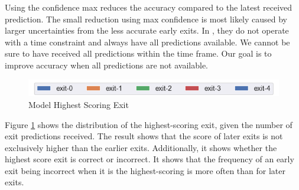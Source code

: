 Using the confidence max reduces the accuracy compared to the latest received prediction. The small reduction using max confidence is most likely caused by larger uncertainties from the less accurate early exits. In \cite{kaya_shallow-deep_nodate}, they do not operate with a time constraint and always have all predictions available. We cannot be sure to have received all predictions within the time frame. Our goal is to improve accuracy when all predictions are not available. 
\begin{figure}
	\captionsetup[subfigure]{justification=centering}
	\centering
	\includegraphics[width=.7\linewidth]{figures/edge/exit0-4_legend}
	\hfill
	\hfill
	\caption[Model Highest Scoring Exit]{Model Highest Scoring Exit}
	\label{fig:exit-highscore}
\end{figure}
Figure \ref{fig:exit-highscore} shows the distribution of the highest-scoring exit, given the number of exit predictions received. The result shows that the score of later exits is not exclusively higher than the earlier exits. Additionally, it shows whether the highest score exit is correct or incorrect. It shows that the frequency of an early exit being incorrect when it is the highest-scoring is more often than for later exits.

